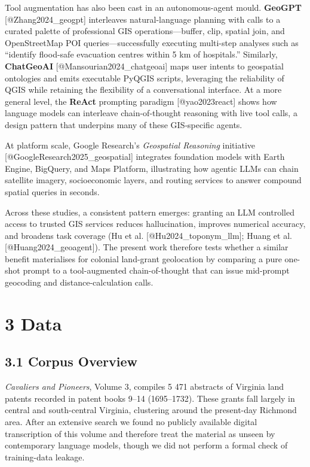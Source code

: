 \documentclass[
  11pt,
]{article}
\begin{document}
Tool augmentation has also been cast in an autonomous-agent mould.
\textbf{GeoGPT} {[}@Zhang2024\_geogpt{]} interleaves natural-language
planning with calls to a curated palette of professional GIS
operations---buffer, clip, spatial join, and OpenStreetMap POI
queries---successfully executing multi-step analyses such as ``identify
flood-safe evacuation centres within 5 km of hospitals.'' Similarly,
\textbf{ChatGeoAI} {[}@Mansourian2024\_chatgeoai{]} maps user intents to
geospatial ontologies and emits executable PyQGIS scripts, leveraging
the reliability of QGIS while retaining the flexibility of a
conversational interface. At a more general level, the \textbf{ReAct}
prompting paradigm {[}@yao2023react{]} shows how language models can
interleave chain-of-thought reasoning with live tool calls, a design
pattern that underpins many of these GIS‐specific agents.

At platform scale, Google Research's \emph{Geospatial Reasoning}
initiative {[}@GoogleResearch2025\_geospatial{]} integrates foundation
models with Earth Engine, BigQuery, and Maps Platform, illustrating how
agentic LLMs can chain satellite imagery, socioeconomic layers, and
routing services to answer compound spatial queries in seconds.

Across these studies, a consistent pattern emerges: granting an LLM
controlled access to trusted GIS services reduces hallucination,
improves numerical accuracy, and broadens task coverage (Hu et al.
{[}@Hu2024\_toponym\_llm{]}; Huang et al. {[}@Huang2024\_geoagent{]}).
The present work therefore tests whether a similar benefit materialises
for colonial land-grant geolocation by comparing a pure one-shot prompt
to a tool-augmented chain-of-thought that can issue mid-prompt geocoding
and distance-calculation calls.

\section{3 Data}\label{data}

\subsection{3.1 Corpus Overview}\label{corpus-overview}

\emph{Cavaliers and Pioneers}, Volume 3, compiles 5 471 abstracts of
Virginia land patents recorded in patent books 9--14 (1695--1732). These
grants fall largely in central and south-central Virginia, clustering
around the present-day Richmond area. After an extensive search we found
no publicly available digital transcription of this volume and therefore
treat the material as unseen by contemporary language models, though we
did not perform a formal check of training-data leakage.
\end{document}
